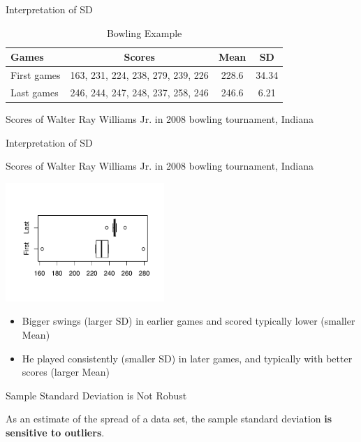\documentclass[14pt]{beamer}\usepackage[]{graphicx}\usepackage[]{color}
\begin{document}
\begin{frame}[fragile]{Interpretation of SD}



{\small{
\begin{table}
\caption{Bowling Example}
\begin{tabular}{@{} lc | c c @{}} \hline
Games & Scores & Mean & SD \\ \hline
First games & 163, 231, 224, 238, 279, 239, 226 & 228.6 & 34.34 \\
Last games  & 246, 244, 247, 248, 237, 258, 246 & 246.6 & 6.21 \\ \hline
\end{tabular}
\end{table}

Scores of Walter Ray Williams Jr. in 2008 bowling  tournament, Indiana

}}
\end{frame}

\begin{frame}[fragile]{Interpretation of SD}

{\footnotesize{
Scores of Walter Ray Williams Jr. in 2008 bowling  tournament, Indiana 


\includegraphics[width=6cm]{figure/LBLAc-1} 


\begin{itemize}
\item Bigger swings (larger SD) in earlier games and scored typically lower  (smaller Mean)
\item He played consistently (smaller SD) in later games, and typically with  better scores (larger Mean)
\end{itemize}
}}
\end{frame}

\begin{frame}[fragile]{Sample Standard Deviation is Not Robust}

As an estimate of the spread of a data set, the sample standard  deviation \textbf{is sensitive to outliers}.

\end{frame}
\end{document}
